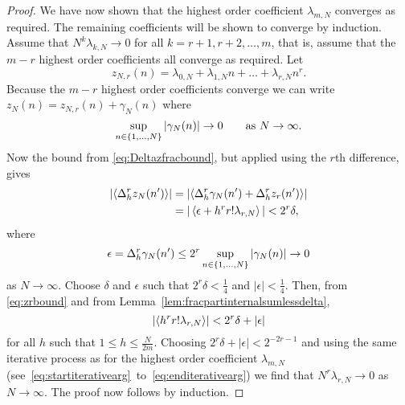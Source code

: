 \documentclass[journal]{IEEEtran}
\begin{document}
\begin{proof}
We have now shown that the highest order coefficient $\lambda_{m,N}$ converges as required. The remaining coefficients will be shown to converge by induction.  Assume that $N^k \lambda_{k,N} \rightarrow 0$ for all $k=r+1, r+2, \dots, m$, that is, assume that the $m-r$ highest order coefficients all converge as required. Let
\[
z_{N,r}(n) = \lambda_{0,N} + \lambda_{1,N} n + \dots + \lambda_{r,N} n^r.
\]
Because the $m-r$ highest order coefficients converge we can write $z_N(n) = z_{N,r}(n) + \gamma_N(n)$ where 
\[
\sup_{n\in\{1,\dots,N\}}\left\vert \gamma_N(n) \right\vert \rightarrow 0 \qquad \text{as $N\rightarrow\infty$}. 
\]
Now the bound from \eqref{eq:Deltazfracbound}, but applied using the $r$th difference, gives
 \begin{equation}\label{eq:zrbound}
\begin{split}
\left|\left\langle   \Delta_h^r z_N(n') \right\rangle\right| &= \left|\left\langle   \Delta_h^r\gamma_N(n') + \Delta_h^r z_r(n')  \right\rangle\right| 
\\ &= |\left\langle  \epsilon + h^r r! \lambda_{r,N}  \right\rangle| < 2^r\delta,
\end{split}
 \end{equation}
 where
\[
\epsilon = \Delta_h^r \gamma_N(n') \leq 2^r \sup_{n\in\{1,\dots,N\}}\left\vert \gamma_N(n) \right\vert \rightarrow 0
\] 
as $N\rightarrow\infty$.  Choose $\delta$ and $\epsilon$ such that $2^r\delta < \tfrac{1}{4}$ and $|\epsilon| < \tfrac{1}{4}$.  Then, from \eqref{eq:zrbound} and from Lemma~\ref{lem:fracpartinternalsumlessdelta},
\[
\left\vert \left\langle  h^r r! \lambda_{r,N}  \right\rangle \right\vert < 2^r\delta + \left\vert \epsilon \right\vert
\]
for all $h$ such that $1 \leq h \leq \tfrac{N}{2m}$.  Choosing $2^r\delta + |\epsilon| < 2^{-2r-1}$ and using the same iterative process as for the highest order coefficient $\lambda_{m,N}$  (see~\eqref{eq:startiterativearg}~to~\eqref{eq:enditerativearg}) we find that $N^r \lambda_{r,N} \rightarrow 0$ as $N\rightarrow\infty$.  The proof now follows by induction.
 \end{proof}

\end{document}
